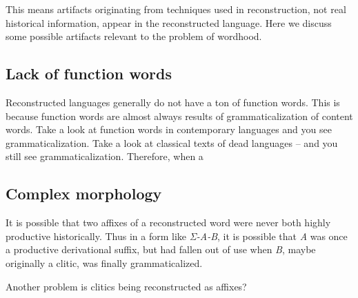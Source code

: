 \documentclass[a4paper, oneside, scheme=plain, 12pt]{article}
\newcommand{\form}[1]{\emph{#1}}
\begin{document}
This means artifacts originating from techniques used in reconstruction,
not real historical information, appear in the reconstructed language.
Here we discuss some possible artifacts relevant to the problem of wordhood.

\subsection{Lack of function words}

Reconstructed languages generally do not have a ton of function words.
This is because function words are almost always results of grammaticalization of content words.
Take a look at function words in contemporary languages and you see grammaticalization.
Take a look at classical texts of dead languages -- and you still see grammaticalization.
Therefore, when a 

\subsection{Complex morphology}

It is possible that two affixes of a reconstructed word were never both highly productive historically.
Thus in a form like \form{Σ-A-B}, it is possible that \form{A} was once a productive derivational suffix,
but had fallen out of use when \form{B}, maybe originally a clitic, was finally grammaticalized.

Another problem is clitics being reconstructed as affixes?

\printbibliography
\end{document}
